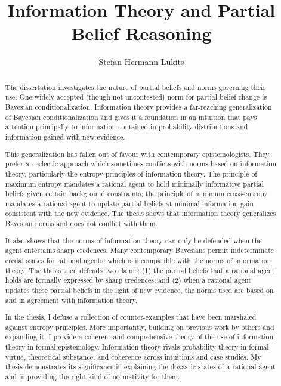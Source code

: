 \documentclass[phd,12pt,oneside]{ubcthesis}
\title{Information Theory and Partial Belief Reasoning}
\author{Stefan Hermann Lukits}
\begin{document}

\frontmatter
\maketitle
\begin{abstract}
  The dissertation investigates the nature of partial beliefs and
  norms governing their use. One widely accepted (though not
  uncontested) norm for partial belief change is Bayesian
  conditionalization. Information theory provides a far-reaching
  generalization of Bayesian conditionalization and gives it a
  foundation in an intuition that pays attention principally to
  information contained in probability distributions and information
  gained with new evidence. 

  This generalization has fallen out of favour with contemporary
  epistemologists. They prefer an eclectic approach which sometimes
  conflicts with norms based on information theory, particularly the
  entropy principles of information theory. The principle of maximum
  entropy mandates a rational agent to hold minimally informative
  partial beliefs given certain background constraints; the principle
  of minimum cross-entropy mandates a rational agent to update partial
  beliefs at minimal information gain consistent with the new
  evidence. The thesis shows that information theory generalizes
  Bayesian norms and does not conflict with them. 

  It also shows that the norms of information theory can only be
  defended when the agent entertains sharp credences. Many
  contemporary Bayesians permit indeterminate credal states for
  rational agents, which is incompatible with the norms of information
  theory. The thesis then defends two claims: (1) the partial beliefs
  that a rational agent holds are formally expressed by sharp
  credences; and (2) when a rational agent updates these partial
  beliefs in the light of new evidence, the norms used are based on
  and in agreement with information theory. 

  In the thesis, I defuse a collection of counter-examples that have
  been marshaled against entropy principles. More importantly,
  building on previous work by others and expanding it, I provide a
  coherent and comprehensive theory of the use of information theory
  in formal epistemology. Information theory rivals probability theory
  in formal virtue, theoretical substance, and coherence across
  intuitions and case studies. My thesis demonstrates its significance
  in explaining the doxastic states of a rational agent and in
  providing the right kind of normativity for them.
\end{abstract}
\end{document}
